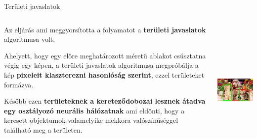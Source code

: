 \documentclass[english, aspectratio=169]{beamer}
\begin{document}
	\begin{frame}{Területi javaslatok}
		\begin{columns}
			\begin{column}{.6\textwidth}
				Az eljárás ami meggyorsította a folyamatot a \textbf{területi javaslatok} algoritmusa volt.\par\smallskip
				Ahelyett, hogy egy előre meghatározott méretű ablakot csúsztatna végig egy képen, a területi javaslatok algoritmusa megpróbálja a kép \textbf{pixeleit klaszterezni hasonlóság szerint}, ezzel területeket formázva.\par\smallskip
				Később ezen \textbf{területeknek a kereteződobozai lesznek átadva egy osztályozó neurális hálózatnak} ami eldönti, hogy a keresett objektumok valamelyike mekkora valószínűséggel található meg a területen.
			\end{column}
			\begin{column}{.4\textwidth}
				\begin{center}
					\includegraphics[height=7cm, width=6cm, keepaspectratio]{images/od_8.png}
				\end{center}
			\end{column}
		\end{columns}
	\end{frame}
	
\end{document}
